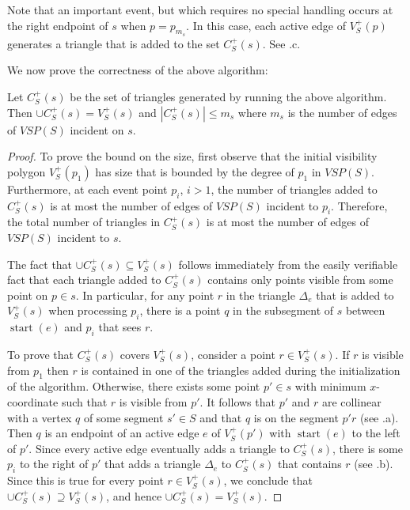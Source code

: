 \documentclass{patmorin}
\newcommand{\VSP}{\mathit{VSP}}
\DeclareMathOperator{\start}{start}
\begin{document}
Note that an important event, but which requires no special handling occurs
at the right endpoint of $s$ when $p=p_{m_s}$.  In this case, each active
edge of $V^+_S(p)$ generates a triangle that is added to the set $C^+_S(s)$.
See .c.

We now prove the correctness of the above algorithm:

\begin{lem}
Let $C^+_S(s)$ be the set of triangles generated by running the above
algorithm.  Then $\cup C^+_S(s) = V^+_S(s)$ and $|C^+_S(s)|\le m_s$ where
$m_s$ is the number of edges of $\VSP(S)$ incident on $s$.
\end{lem}

\begin{proof}
To prove the bound on the size, first observe that the initial visibility
polygon $V^+_S(p_1)$ has size that is bounded by the degree of $p_1$ in
$\VSP(S)$.  Furthermore, at each event point $p_i$, $i>1$, the number of
triangles added to $C^+_S(s)$ is at most the number of edges of $\VSP(S)$
incident to $p_i$.  Therefore, the total number of triangles in $C^+_S(s)$
is at most the number of edges of $\VSP(S)$ incident to $s$.

The fact that $\cup C^+_S(s)\subseteq V^+_S(s)$ follows immediately from
the easily verifiable fact that each triangle added to $C^+_S(s)$ contains
only points visible from some point on $p\in s$.  In particular, for any
point $r$ in the triangle $\Delta_e$ that is added to $V^+_S(s)$ when
processing $p_i$, there is a point $q$ in the subsegment of $s$ between
$\start(e)$ and $p_i$ that sees $r$.

To prove that $C^+_S(s)$ covers $V^+_S(s)$, consider a point $r\in
V^+_S(s)$.  If $r$ is visible from $p_1$ then $r$ is contained in
one of the triangles added during the initialization of the algorithm.
Otherwise, there exists some point $p'\in s$ with minimum $x$-coordinate
such that $r$ is visible from $p'$.  It follows that $p'$ and $r$
are collinear with a vertex $q$ of some segment $s'\in S$ and that $q$
is on the segment $p'r$ (see .a).  Then $q$ is an
endpoint of an active edge $e$ of $V^+_S(p')$ with $\start(e)$ to the
left of $p'$.  Since every active edge eventually adds a triangle to
$C^+_S(s)$, there is some $p_i$ to the right of $p'$ that adds a triangle
$\Delta_e$ to $C^+_S(s)$ that contains $r$ (see .b).
Since this is true for every point $r\in V^+_S(s)$, we conclude that
$\cup C^+_S(s)\supseteq V^+_S(s)$, and hence $\cup C^+_S(s)= V^+_S(s)$.
\end{proof}
\end{document}
